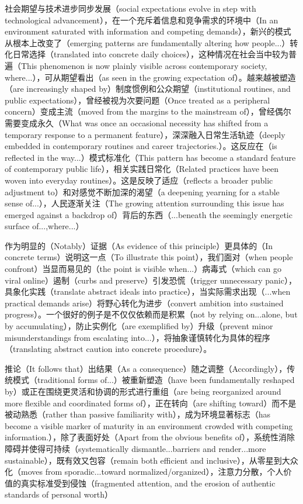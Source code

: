 ﻿\documentclass[lang=cn,11pt]{elegantbook}
\begin{document}
社会期望与技术进步同步发展（social expectations evolve in step with technological advancement），在一个充斥着信息和竞争需求的环境中（In an environment saturated with information and competing demands），新兴的模式从根本上改变了（emerging patterns are fundamentally altering how people...）转化日常选择（translated into concrete daily choices），这种情况在社会当中较为普遍（This phenomenon is now plainly visible across contemporary society, where...），可从期望看出（as seen in the growing expectation of）。越来越被塑造（are increasingly shaped by）制度惯例和公众期望（institutional routines, and public expectations），曾经被视为次要问题（Once treated as a peripheral concern）变成主流（moved from the margins to the mainstream of），曾经偶尔需要变成永久（What was once an occasional necessity has  shifted from a temporary response to a permanent feature），深深融入日常生活轨迹（deeply embedded in contemporary routines and career trajectories.）。这反应在（is reflected in the way...）模式标准化（This pattern has become a standard feature of contemporary public life），相关实践日常化（Related practices have been woven into everyday routines）。这是反映了适应（reflects a broader public adjustment to）和对感觉不断加深的渴望（a deepening yearning for a stable sense of...），人民逐渐关注（The growing attention surrounding this issue has emerged against a backdrop of）背后的东西（...beneath the seemingly energetic surface of...,where...）

作为明显的（Notably）证据（As evidence of this principle）更具体的（In concrete terms）说明这一点（To illustrate this point），我们面对（when people confront）当显而易见的（the point is visible when...）病毒式（which can go viral online）遏制（curbs and preserve）引发恐慌（trigger unnecessary panic），具象化实践（translate abstract ideals into practice），当实际需求出现（...when practical demands arise）将野心转化为进步（convert ambition into sustained progress）。一个很好的例子是不仅仅依赖而是积累（not by relying on...alone, but by accumulating），防止实例化（are exemplified by）升级（prevent minor misunderstandings from escalating into...），将抽象谨慎转化为具体的程序（translating abstract caution into concrete procedure）。

推论（It follows that）出结果（As a consequence）随之调整（Accordingly），传统模式（traditional forms of...）被重新塑造（have been fundamentally reshaped by）或正在围绕更灵活和协调的形式进行重组（are being reorganized around more flexible and coordinated forms of），正在转向（are shifting toward）而不是被动熟悉（rather than passive familiarity with），成为环境显著标志（has become a visible marker of maturity in an environment crowded with competing information.），除了表面好处（Apart from the obvious benefits of），系统性消除障碍并使得可持续（systematically dismantle...barriers and  render...more sustainable），既有效又包容（remain both efficient and inclusive），从零星到大众化（moves from sporadic...toward normalized/organized），注意力分散，个人价值的真实标准受到侵蚀（fragmented attention, and the erosion of authentic standards of personal worth）
\end{document}
